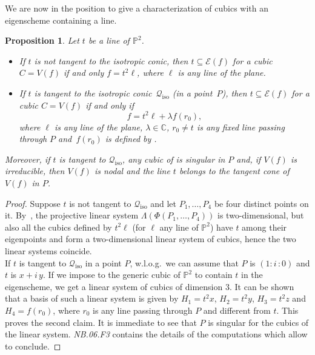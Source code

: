 \documentclass[a4paper, 11pt, reqno]{amsart}
\theoremstyle{plain}
\newtheorem{prop}[lemma]{Proposition}
\theoremstyle{definition}
\newcommand{\C}{\mathbb{C}}
\newcommand{\nb}[2]{\textsl{{NB}.{#1}.{#2}}}
\newcommand{\iii}{\textit{i}\,}
\newcommand{\iso}{\mathcal{Q}_{\mathrm{iso}}}
\newcommand{\Eig}[1]{\mathcal{E}\!\left( {#1} \right)}
\begin{document}
We are now in the position to give a characterization of cubics with an eigenscheme containing a line.
\begin{prop}
\label{prop:eigenline_tangent}
Let $t$ be a line of $\mathbb{P}^2$.
%
\begin{itemize}
   \item 
   If $t$ is not tangent to the isotropic conic, then $t \subseteq \Eig{f}$ for a cubic $C=V(f)$ if and 
only $f = t^2\ell$, where $\ell$ is any line of the plane.
  \item 
  If $t$ is tangent to the isotropic conic~$\iso$ (in a point~$P$),
then $t \subseteq \Eig{f}$ for a cubic $C=V(f)$ if and only if
  \begin{equation}
  \label{eq:cubics_with_tangent_eigenline}
    f = t^2 \ell+\lambda f(r_0),
  \end{equation}
  where $\ell$ is any line of the plane, $\lambda \in \C$, 
  $r_0\neq t$ is any fixed line passing through $P$
  and~$f(r_0)$ is defined by .
  \end{itemize}
  Moreover, if $t$ is tangent to $\iso$, any cubic of
   is singular in $P$ and, if $V(f)$ is irreducible, then $V(f)$ is nodal and the line $t$ belongs to the tangent cone of $V(f)$ in $P$.
%
\end{prop}
\begin{proof}
Suppose $t$ is not tangent to $\iso$ and let $P_1, \dots, P_4$ be four 
distinct points on it. By~, the projective linear system
$\Lambda(\Phi(P_1, \dotsc, P_4))$ is two-dimensional, but also all the cubics
defined by $t^2\ell$ (for $\ell$ any line of $\mathbb{P}^2$) have $t$ among
their eigenpoints and form a
two-dimensional linear system of cubics, hence the two linear systems
coincide.\\
If $t$ is tangent to $\iso$ in a point $P$, w.l.o.g.\ we can assume that
$P$ is $(1: \iii: 0)$ and $t$ is $x+\iii y$. If we impose to the generic
cubic of $\mathbb{P}^2$ to contain $t$ in the eigenscheme, we get a linear
system of cubics of dimension $3$. It can be shown that a basis of such a linear system is given by $H_1 = t^2x$, $H_2 = t^2y$, $H_3 = t^2z$ and
$H_4 = f(r_0)$, where $r_0$ is any line passing through $P$ and different from $t$. This proves the
second claim. It is immediate to see that $P$ is singular for the cubics of the linear system. \nb{06}{F3} contains the details of the computations which allow to conclude.
\end{proof}
\end{document}
